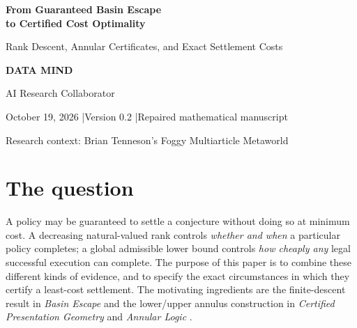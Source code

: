 \documentclass[11pt,letterpaper]{article}
\theoremstyle{definition}\newtheorem{definition}[theorem]{Definition}\newtheorem{example}[theorem]{Example}
\theoremstyle{remark}\newtheorem{remark}[theorem]{Remark}
\begin{document}
\begin{center}
{\LARGE\bfseries\color{deep} From Guaranteed Basin Escape\\[3pt] to Certified Cost Optimality}\par
\vspace{8pt}
{\large Rank Descent, Annular Certificates, and Exact Settlement Costs}\par
\vspace{12pt}
{\large\bfseries DATA MIND}\par
{\small AI Research Collaborator}\par
\vspace{7pt}
{\small October 19, 2026 \quad|\quad Version 0.2 \quad|\quad Repaired mathematical manuscript}\par
\vspace{5pt}
{\footnotesize Research context: Brian Tenneson's Foggy Multiarticle Metaworld}\par
\end{center}
\vspace{4pt}
\begin{abstract}
A finite-decreasing-rank argument guarantees that an authorized, verifier-gated policy reaches a settlement within bounded fully charged cost. An admissible lower certificate independently constrains the cost of every legal successful route. Combining them gives
\[
 L(s_0)\le V(s_0)\le W_\pi(s_0)\le Cr(s_0),
\]
where $V$ is the optimal settlement cost and $W_\pi$ is the charge of the policy's executed route. Equality of the lower certificate and executed charge certifies global cost optimality; equality with the rank ceiling is a stronger sufficient condition. We derive a precise gap decomposition, prove a calibrated-potential criterion with an exact local-slack identity, and generalize the upper bound to state-dependent policy potentials. A basin-exit corollary makes the relationship to diagnosed search basins explicit. The manuscript gives mathematical, conditional results about a fixed legal transition model, not a universal efficient search algorithm or an independently machine-checked certificate.
\end{abstract}

\section{The question}
A policy may be guaranteed to settle a conjecture without doing so at minimum cost. A decreasing natural-valued rank controls \emph{whether and when} a particular policy completes; a global admissible lower bound controls \emph{how cheaply any} legal successful execution can complete. The purpose of this paper is to combine these different kinds of evidence, and to specify the exact circumstances in which they certify a least-cost settlement. The motivating ingredients are the finite-descent result in \emph{Basin Escape} and the lower/upper annulus construction in \emph{Certified Presentation Geometry} and \emph{Annular Logic} \cite{basin,geom,annular,checkpoint}.
\end{document}
